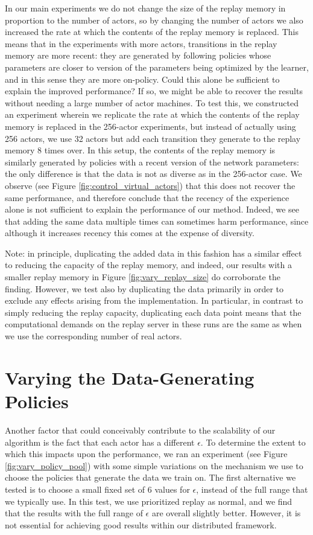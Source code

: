 \documentclass{article} %
\begin{document}
In our main experiments we do not change the size of the replay memory in proportion to the number of actors, so by changing the number of actors we also increased the rate at which the contents of the replay memory is replaced. This means that in the experiments with more actors, transitions in the replay memory are more recent: they are generated by following policies whose parameters are closer to version of the parameters being optimized by the learner, and in this sense they are more on-policy. Could this alone be sufficient to explain the improved performance? If so, we might be able to recover the results without needing a large number of actor machines. To test this, we constructed an experiment wherein we replicate the rate at which the contents of the replay memory is replaced in the 256-actor experiments, but instead of actually using 256 actors, we use 32 actors but add each transition they generate to the replay memory 8 times over. In this setup, the contents of the replay memory is similarly generated by policies with a recent version of the network parameters: the only difference is that the data is not as diverse as in the 256-actor case. We observe (see Figure \ref{fig:control_virtual_actors}) that this does not recover the same performance, and therefore conclude that the recency of the experience alone is not sufficient to explain the performance of our method. Indeed, we see that adding the same data multiple times can sometimes harm performance, since although it increases recency this comes at the expense of diversity.

Note: in principle, duplicating the added data in this fashion has a similar effect to reducing the capacity of the replay memory, and indeed, our results with a smaller replay memory in Figure \ref{fig:vary_replay_size} do corroborate the finding. However, we test also by duplicating the data primarily in order to exclude any effects arising from the implementation. In particular, in contrast to simply reducing the replay capacity, duplicating each data point means that the computational demands on the replay server in these runs are the same as when we use the corresponding number of real actors.

\section{Varying the Data-Generating Policies}

Another factor that could conceivably contribute to the scalability of our algorithm is the fact that each actor has a different $\epsilon$. To determine the extent to which this impacts upon the performance, we ran an experiment (see Figure \ref{fig:vary_policy_pool}) with some simple variations on the mechanism we use to choose the policies that generate the data we train on. The first alternative we tested is to choose a small fixed set of 6 values for $\epsilon$, instead of the full range that we typically use. In this test, we use prioritized replay as normal, and we find that the results with the full range of $\epsilon$ are overall slightly better. However, it is not essential for achieving good results within our distributed framework.
\end{document}

